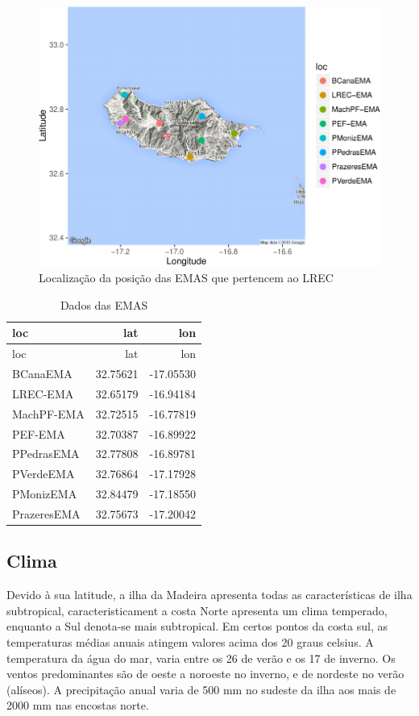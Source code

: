 \documentclass[]{article}
\begin{document}
\begin{figure}

{\centering \includegraphics{static_files/figure-latex/ggmap-1} 

}

\caption{Localização da posição das EMAS que pertencem ao LREC}\label{fig:ggmap}
\end{figure}

\begin{longtable}[]{@{}lrr@{}}
\caption{Dados das EMAS}\tabularnewline
\toprule
loc & lat & lon\tabularnewline
\midrule
\endfirsthead
\toprule
loc & lat & lon\tabularnewline
\midrule
\endhead
BCanaEMA & 32.75621 & -17.05530\tabularnewline
LREC-EMA & 32.65179 & -16.94184\tabularnewline
MachPF-EMA & 32.72515 & -16.77819\tabularnewline
PEF-EMA & 32.70387 & -16.89922\tabularnewline
PPedrasEMA & 32.77808 & -16.89781\tabularnewline
PVerdeEMA & 32.76864 & -17.17928\tabularnewline
PMonizEMA & 32.84479 & -17.18550\tabularnewline
PrazeresEMA & 32.75673 & -17.20042\tabularnewline
\bottomrule
\end{longtable}

\subsection{Clima}\label{clima}

Devido à sua latitude, a ilha da Madeira apresenta todas as
características de ilha subtropical, caracteristicament a costa Norte
apresenta um clima temperado, enquanto a Sul denota-se mais subtropical.
Em certos pontos da costa sul, as temperaturas médias anuais atingem
valores acima dos 20 graus celsius. A temperatura da água do mar, varia
entre os 26 de verão e os 17 de inverno. Os ventos predominantes são de
oeste a noroeste no inverno, e de nordeste no verão (alíseos). A
precipitação anual varia de 500 mm no sudeste da ilha aos mais de 2000
mm nas encostas norte.
\end{document}
